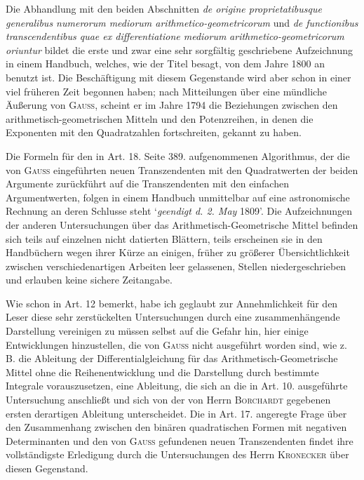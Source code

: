 \bigskip
Die Abhandlung mit den beiden Abschnitten \textit{de origine proprietatibusque generalibus numerorum mediorum arithmetico-geometricorum} und \textit{de functionibus transcendentibus quae ex differentiatione mediorum}
\providecommand{\TStart}{\hspace*{.5em}}\providecommand{\TCont}{\hspace*{1em}}\providecommand{\TD}{\hspace{.3em}.\hspace{.3em}.}
\textit{arithmetico-geometricorum oriuntur} bildet die erste und zwar eine sehr sorgfältig geschriebene Aufzeichnung in einem Handbuch, welches, wie der Titel besagt, von dem Jahre 1800 an benutzt ist. Die Beschäftigung mit diesem Gegenstande wird aber schon in einer viel früheren Zeit begonnen haben; nach Mitteilungen über eine mündliche Äußerung von \textsc{Gauss}, scheint er im Jahre 1794 die Beziehungen zwischen den arithmetisch-geometrischen Mitteln und den Potenzreihen, in denen die Exponenten mit den Quadratzahlen fortschreiten, gekannt zu haben.

Die Formeln für den in Art. 18. Seite 389. aufgenommenen Algorithmus, der die von \textsc{Gauss} eingeführten neuen Transzendenten mit den Quadratwerten der beiden Argumente zurückführt auf die Transzendenten mit den einfachen Argumentwerten, folgen in einem Handbuch unmittelbar auf eine astronomische Rechnung an deren Schlusse steht `\textit{geendigt d. 2. May} 1809'. Die Aufzeichnungen der anderen Untersuchungen über das Arithmetisch-Geometrische Mittel befinden sich teils auf einzelnen nicht datierten Blättern, teils erscheinen sie in den Handbüchern wegen ihrer Kürze an einigen, früher zu größerer Übersichtlichkeit zwischen verschiedenartigen Arbeiten leer gelassenen, Stellen niedergeschrieben und erlauben keine sichere Zeitangabe.

Wie schon in Art. 12 bemerkt, habe ich geglaubt zur Annehmlichkeit für den Leser diese sehr zerstückelten Untersuchungen durch eine zusammenhängende Darstellung vereinigen zu müssen selbst auf die Gefahr hin, hier einige Entwicklungen hinzustellen, die von \textsc{Gauss} nicht ausgeführt worden sind, wie z. B. die Ableitung der Differentialgleichung für das Arithmetisch-Geometrische Mittel ohne die Reihenentwicklung und die Darstellung durch bestimmte Integrale vorauszusetzen, eine Ableitung, die sich an die in Art. 10. ausgeführte Untersuchung anschließt und sich von der von Herrn \textsc{Borchardt} gegebenen ersten derartigen Ableitung unterscheidet. Die in Art. 17. angeregte Frage über den Zusammenhang zwischen den binären quadratischen Formen mit negativen Determinanten und den von \textsc{Gauss} gefundenen neuen Transzendenten findet ihre vollständigste Erledigung durch die Untersuchungen des Herrn \textsc{Kronecker} über diesen Gegenstand.

